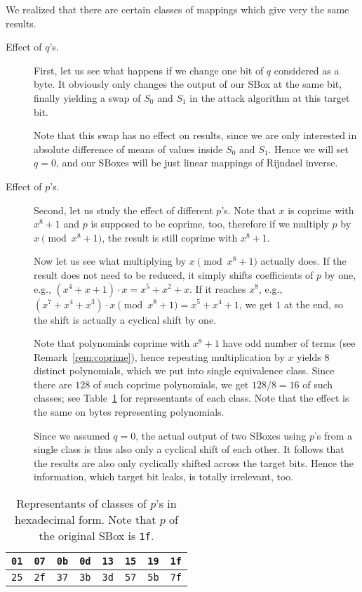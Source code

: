 \begin{remark}
\label{rem:pqeffect}
	We realized that there are certain classes of mappings which give very the same results.
	\begin{description}
		\item[Effect of $q$'s.]
			First, let us see what happens if we change one bit of $q$ considered as a byte. It obviously only changes the output of our SBox at the same bit, finally yielding a swap of $S_0$ and $S_1$ in the attack algorithm at this target bit.
			
			Note that this swap has no effect on results, since we are only interested in absolute difference of means of values inside $S_0$ and $S_1$. Hence we will set $q = 0$, and our SBoxes will be just linear mappings of Rijndael inverse.
		
		\item[Effect of $p$'s.]
			Second, let us study the effect of different $p$'s. Note that $x$ is coprime with $x^8+1$ and $p$ is supposed to be coprime, too, therefore if we multiply $p$ by $x\pmod{x^8+1}$, the result is still coprime with $x^8+1$.
			
			Now let us see what multiplying by $x\pmod{x^8+1}$ actually does. If the result does not need to be reduced, it simply shifts coefficients of $p$ by one, e.g., $(x^4 + x + 1) \cdot x = x^5 + x^2 + x$. If it reaches $x^8$, e.g., $(x^7 + x^4 + x^3) \cdot x \pmod{x^8+1} = x^5 + x^4 + 1$, we get $1$ at the end, so the shift is actually a cyclical shift by one.
			
			Note that polynomials coprime with $x^8+1$ have odd number of terms (see Remark~\ref{rem:coprime}), hence repeating multiplication by $x$ yields $8$ distinct polynomials, which we put into single equivalence class. Since there are $128$ of such coprime polynomials, we get $128/8=16$ of such classes; see Table~\ref{tab:classrepre} for representants of each class. Note that the effect is the same on bytes representing polynomials.
			
			Since we assumed $q = 0$, the actual output of two SBoxes using $p$'s from a single class is thus also only a cyclical shift of each other. It follows that the results are also only cyclically shifted across the target bits. Hence the information, which target bit leaks, is totally irrelevant, too.
	\end{description}
\end{remark}

\begin{table}[h]
	\begin{center}
	\begin{tabular}{| c | c | c | c | c | c | c | c |}
		\hline
		{\tt 01} & {\tt 07} & {\tt 0b} & {\tt 0d} & {\tt 13} & {\tt 15} & {\tt 19} & {\tt 1f} \\
		\hline
		{\tt 25} & {\tt 2f} & {\tt 37} & {\tt 3b} & {\tt 3d} & {\tt 57} & {\tt 5b} & {\tt 7f} \\
		\hline
	\end{tabular}
	\end{center}
\caption{Representants of classes of $p$'s in hexadecimal form. Note that $p$ of the original SBox is {\tt 1f}.}
\label{tab:classrepre}
\end{table}

